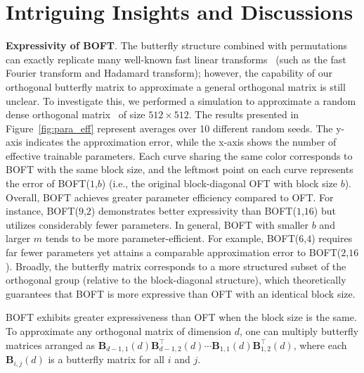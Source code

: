 \section{Intriguing Insights and Discussions}

\textbf{Expressivity of BOFT}. The butterfly structure combined with permutations can exactly replicate many well-known fast linear transforms~\cite{dao2019learning,dao2019kaleidoscope} (such as the fast Fourier transform and Hadamard transform); however, the capability of our orthogonal butterfly matrix to approximate a general orthogonal matrix is still unclear. To investigate this, we performed a simulation to approximate a random dense orthogonal matrix~\cite{anderson1987generation} of size $512 \times 512$. The results presented in Figure~\ref{fig:para_eff} represent averages over 10 different random seeds. The y-axis indicates the approximation error, while the x-axis shows the number of effective trainable parameters. Each curve sharing the same color corresponds to BOFT with the same block size, and the leftmost point on each curve represents the error of BOFT($1$,$b$) (i.e., the original block-diagonal OFT with block size $b$). Overall, BOFT achieves greater parameter efficiency compared to OFT. For instance, BOFT($9$,$2$) demonstrates better expressivity than BOFT($1$,$16$) but utilizes considerably fewer parameters. In general, BOFT with smaller $b$ and larger $m$ tends to be more parameter-efficient. For example, BOFT($6$,$4$) requires far fewer parameters yet attains a comparable approximation error to BOFT($2$,$16$). Broadly, the butterfly matrix corresponds to a more structured subset of the orthogonal group (relative to the block-diagonal structure), which theoretically guarantees that BOFT is more expressive than OFT with an identical block size.

\begin{theorem}\label{thm:exp_boft}
    BOFT exhibits greater expressiveness than OFT when the block size is the same. To approximate any orthogonal matrix of dimension $d$, one can multiply butterfly matrices arranged as $\bm{B}_{d-1,1}(d)\bm{B}^\top_{d-1,2}(d)\cdots\bm{B}_{1,1}(d)\bm{B}^\top_{1,2}(d)$, where each $\bm{B}_{i,j}(d)$ is a butterfly matrix for all $i$ and $j$.
\end{theorem}

